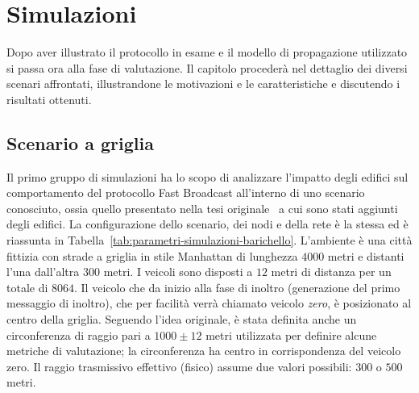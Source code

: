 
\chapter{Simulazioni}\label{chap:simulazioni}
Dopo aver illustrato il protocollo in esame e il modello di propagazione utilizzato si passa ora alla fase di valutazione.
Il capitolo procederà nel dettaglio dei diversi scenari affrontati,
illustrandone le motivazioni e le caratteristiche e discutendo i risultati ottenuti.
%
\section{Scenario a griglia}\label{sec:configurazione-griglia}
Il primo gruppo di simulazioni ha lo scopo di analizzare l'impatto degli edifici sul comportamento del protocollo
Fast Broadcast all'interno di uno scenario conosciuto, ossia quello presentato nella tesi originale~\cite{Barichello2017propagazione}
a cui sono stati aggiunti degli edifici.
La configurazione dello scenario, dei nodi e della rete è la stessa ed è riassunta in Tabella~\ref{tab:parametri-simulazioni-barichello}.
L'ambiente è una città fittizia con strade a griglia in stile Manhattan di lunghezza $4000$ metri e distanti l'una dall'altra $300$ metri.
I veicoli sono disposti a $12$ metri di distanza per un totale di $8064$.
Il veicolo che da inizio alla fase di inoltro (generazione del primo messaggio di inoltro),
che per facilità verrà chiamato veicolo \textit{zero}, è posizionato al centro della griglia.
Seguendo l'idea originale, è stata definita anche un circonferenza di raggio pari a $1000\pm12$ metri utilizzata per definire alcune metriche di valutazione;
la circonferenza ha centro in corrispondenza del veicolo zero.
Il raggio trasmissivo effettivo (fisico) assume due valori possibili: $300$ o $500$ metri.
%
